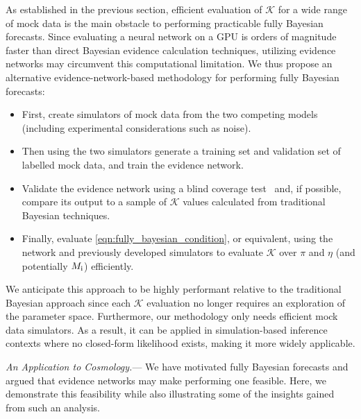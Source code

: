\documentclass[twocolumn,english,aps,prl,amsmath,amssymb,reprint,footinbib,floatfix,showkeys]{revtex4-2}
\newcommand{\prior}{\pi}
\newcommand{\br}{\mathcal{K}}
\begin{document}
As established in the previous section, efficient evaluation of $\br$ for a wide range of mock data is the main obstacle to performing practicable fully Bayesian forecasts. 
Since evaluating a neural network on a GPU is orders of magnitude faster than direct Bayesian evidence calculation techniques, utilizing evidence networks may circumvent this computational limitation. 
We thus propose an alternative evidence-network-based methodology for performing fully Bayesian forecasts:
\begin{itemize}
    \item First, create simulators of mock data from the two competing models (including experimental considerations such as noise).
    \item Then using the two simulators generate a training set and validation set of labelled mock data, and train the evidence network.
    \item Validate the evidence network using a blind coverage test~\citep{EN} and, if possible, compare its output to a sample of $\br$ values calculated from traditional Bayesian techniques.
    \item Finally, evaluate \cref{eqn:fully_bayesian_condition}, or equivalent, using the network and previously developed simulators to evaluate $\br$ over $\prior$ and $\eta$ (and potentially $M_{\rm i}$) efficiently. 
\end{itemize}
We anticipate this approach to be highly performant relative to the traditional Bayesian approach since each $\br$ evaluation no longer requires an exploration of the parameter space.
Furthermore, our methodology only needs efficient mock data simulators.
As a result, it can be applied in simulation-based inference contexts where no closed-form likelihood exists, making it more widely applicable. 




\textit{An Application to Cosmology.}---
We have motivated fully Bayesian forecasts and argued that evidence networks may make performing one feasible.
Here, we demonstrate this feasibility while also illustrating some of the insights gained from such an analysis. 
\end{document}
